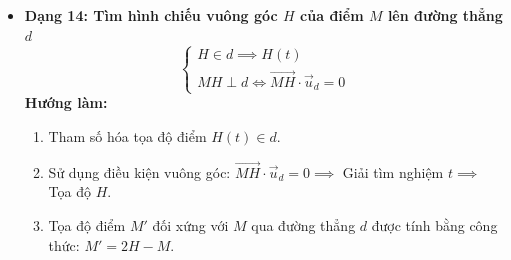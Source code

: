 \documentclass[12pt,a4paper]{article}
\begin{document}
\begin{theorybox}
\begin{itemize}
        \item \textbf{Dạng 14: Tìm hình chiếu vuông góc $H$ của điểm $M$ lên đường thẳng $d$}
        \[
            \begin{cases} H \in d \implies H(t) \\ MH \perp d \iff \vec{MH} \cdot \vec{u}_d = 0 \end{cases}
        \]
        \textbf{Hướng làm:}
        \begin{enumerate}
            \item Tham số hóa tọa độ điểm $H(t) \in d$.
            \item Sử dụng điều kiện vuông góc: $\vec{MH} \cdot \vec{u}_d = 0 \implies$ Giải tìm nghiệm $t \implies$ Tọa độ $H$.
            \item Tọa độ điểm $M'$ đối xứng với $M$ qua đường thẳng $d$ được tính bằng công thức: $M' = 2H - M$.
        \end{enumerate}
    \end{itemize}
\end{theorybox}

\newpage

\end{document}

